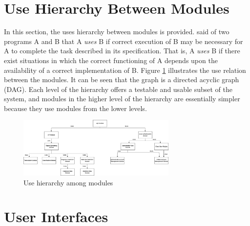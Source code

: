 \documentclass[12pt, titlepage]{article}
\begin{document}
\section{Use Hierarchy Between Modules} \label{SecUse}

In this section, the uses hierarchy between modules is
provided. \citet{Parnas1978} said of two programs A and B that A {\em uses} B if
correct execution of B may be necessary for A to complete the task described in
its specification. That is, A {\em uses} B if there exist situations in which
the correct functioning of A depends upon the availability of a correct
implementation of B.  Figure \ref{FigUH} illustrates the use relation between
the modules. It can be seen that the graph is a directed acyclic graph
(DAG). Each level of the hierarchy offers a testable and usable subset of the
system, and modules in the higher level of the hierarchy are essentially simpler
because they use modules from the lower levels.



\begin{figure}[H]
\centering
\includegraphics[width=0.7\textwidth]{user-hierarchy.png}
\caption{Use hierarchy among modules}
\label{FigUH}
\end{figure}


\section{User Interfaces}
\end{document}
